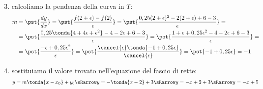 \begin{esempio}
{~}


\begin{enumerate}[noitemsep]
  \setcounter{enumi}{2}
 \item calcoliamo la pendenza della curva in \(T\):
\begin{align*}
m&=\pst{\dfrac{d y}{d x}}=
\pst{\dfrac{f(2+\epsilon)-f(2)}{\epsilon}}=
\pst{\dfrac{0,25(2+\epsilon)^2-2(2+\epsilon)+6-3}{\epsilon}}=\\
 &=\pst{\dfrac{0,25\tonda{4+4\epsilon+\epsilon^2}-4-2\epsilon+6-3}
              {\epsilon}}
 =\pst{\dfrac{1+\epsilon+0,25\epsilon^2-4-2\epsilon+6-3}
             {\epsilon}}=\\
&=\pst{\dfrac{-\epsilon+0,25\epsilon^2}{\epsilon}}=
\pst{\dfrac{\cancel{\epsilon}\tonda{-1+0,25\epsilon}}{\cancel{\epsilon}}}
=\pst{-1+0,25\epsilon} = - 1
\end{align*}
 \item sostituiamo il valore trovato nell'equazione del fascio di rette:
\[y = m \tonda{x-x_0}+y_0 \sRarrow y = - \tonda{x-2}+3 \sRarrow 
y = -x+2+3 \sRarrow y = -x+5\]
\end{enumerate}
\end{esempio}

